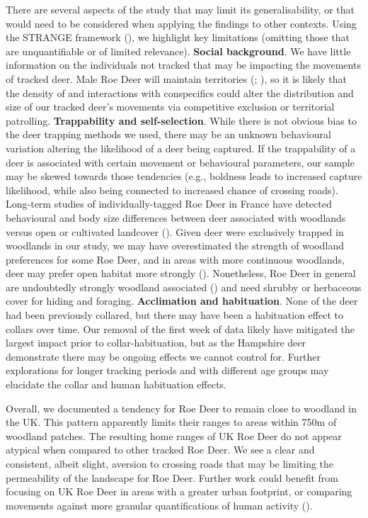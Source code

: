 \documentclass[10pt,a4paper]{article}
\begin{document}
There are several aspects of the study that may limit its generalisability, or that would need to be considered when applying the findings to other contexts.
Using the STRANGE framework (), we highlight key limitations (omitting those that are unquantifiable or of limited relevance).
\textbf{Social background}.
We have little information on the individuals not tracked that may be impacting the movements of tracked deer.
Male Roe Deer will maintain territories (; ), so it is likely that the density of and interactions with conspecifics could alter the distribution and size of our tracked deer's movements via competitive exclusion or territorial patrolling.
\textbf{Trappability and self-selection}.
While there is not obvious bias to the deer trapping methods we used, there may be an unknown behavioural variation altering the likelihood of a deer being captured.
If the trappability of a deer is associated with certain movement or behavioural parameters, our sample may be skewed towards those tendencies (e.g., boldness leads to increased capture likelihood, while also being connected to increased chance of crossing roads).
Long-term studies of individually-tagged Roe Deer in France have detected behavioural and body size differences between deer associated with woodlands versus open or cultivated landcover ().
Given deer were exclusively trapped in woodlands in our study, we may have overestimated the strength of woodland preferences for some Roe Deer, and in areas with more continuous woodlands, deer may prefer open habitat more strongly ().
Nonetheless, Roe Deer in general are undoubtedly strongly woodland associated () and need shrubby or herbaceous cover for hiding and foraging.
\textbf{Acclimation and habituation}.
None of the deer had been previously collared, but there may have been a habituation effect to collars over time.
Our removal of the first week of data likely have mitigated the largest impact prior to collar-habituation, but as the Hampshire deer demonstrate there may be ongoing effects we cannot control for.
Further explorations for longer tracking periods and with different age groups may elucidate the collar and human habituation effects.

Overall, we documented a tendency for Roe Deer to remain close to woodland in the UK.
This pattern apparently limits their ranges to areas within 750m of woodland patches.
The resulting home ranges of UK Roe Deer do not appear atypical when compared to other tracked Roe Deer.
We see a clear and consistent, albeit slight, aversion to crossing roads that may be limiting the permeability of the landscape for Roe Deer.
Further work could benefit from focusing on UK Roe Deer in areas with a greater urban footprint, or comparing movements against more granular quantifications of human activity ().
\end{document}
